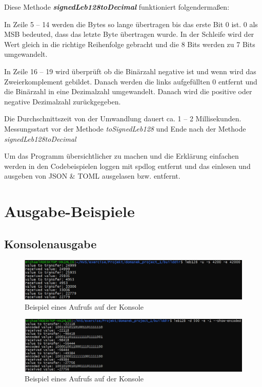 \documentclass{article}
\begin{document}
Diese Methode \textit{\textbf{signedLeb128toDecimal}} funktioniert folgendermaßen:

In Zeile 5 -- 14 werden die Bytes so lange übertragen bis das erste Bit 0 ist.
0 als MSB bedeuted, dass das letzte Byte übertragen wurde. In der Schleife wird der Wert gleich in die richtige Reihenfolge gebracht und die 8 Bits werden zu 7 Bits umgewandelt.

In Zeile 16 -- 19 wird überprüft ob die Binärzahl negative ist und wenn wird das Zweierkomplement gebildet. Danach werden die links aufgefüllten 0 entfernt und die Binärzahl in eine Dezimalzahl umgewandelt. Danach wird die positive oder negative Dezimalzahl zurückgegeben.

Die Durchschnittszeit von der Umwandlung dauert ca. 1 -- 2 Millisekunden.
Messungsstart vor der Methode \textit{toSignedLeb128} und Ende nach der Methode \textit{signedLeb128toDecimal}

Um das Programm übersichtlicher zu machen und die Erklärung einfachen werden in den Codebeispielen loggen mit spdlog entfernt und das einlesen und ausgeben von JSON \& TOML ausgelasen bzw. entfernt.

\section{Ausgabe-Beispiele}

\subsection{Konsolenausgabe}

\begin{figure}[h]
\includegraphics[width=\linewidth]{Konsole}
\caption{Beispiel eines Aufrufs auf der Konsole}
\end{figure}

\begin{figure}[h]
\includegraphics[width=\linewidth]{Konsole2}
\caption{Beispiel eines Aufrufs auf der Konsole}
\end{figure}
\end{document}
